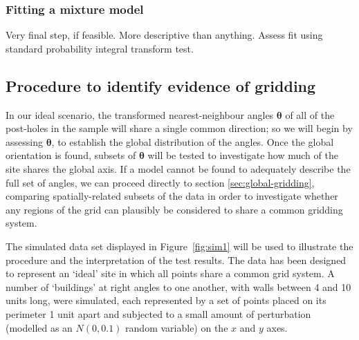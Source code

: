 \documentclass[../../ArchStats.tex]{subfiles}
\begin{document}





\subsubsection{Fitting a mixture model}


Very final step, if feasible. More descriptive than anything.
Assess fit using standard probability integral transform test.

\subsection{Procedure to identify evidence of gridding}

In our ideal scenario, the transformed nearest-neighbour angles $\boldsymbol{\theta}$ of all of the post-holes in the sample will share a single common direction; so we will begin by assessing $\boldsymbol{\theta}$, to establish the global distribution of the angles. Once the global orientation is found, subsets of $\boldsymbol{\theta}$ will be tested to investigate how much of the site shares the global axis. If a model cannot be found to adequately describe the full set of angles, we can proceed directly to section \ref{sec:global-gridding}, comparing spatially-related subsets of the data in order to investigate whether any regions of the grid can plausibly be considered to share a common gridding system.

The simulated data set displayed in Figure~\ref{fig:sim1} will be used to illustrate the procedure and the interpretation of the test results. The data has been designed to represent an `ideal' site in which all points share a common grid system. A number of `buildings' at right angles to one another, with walls between 4 and 10 units long, were simulated, each represented by a set of points placed on its perimeter 1 unit apart and subjected to a small amount of perturbation (modelled as an $N(0,0.1)$ random variable) on the $x$ and $y$ axes.
\end{document}
